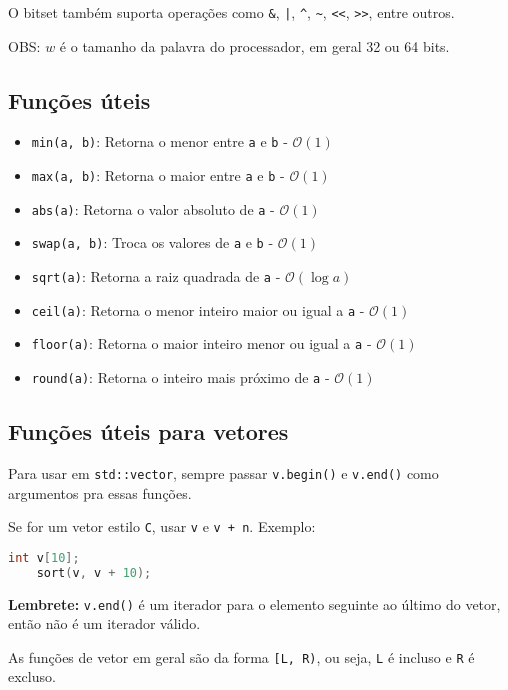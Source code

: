 \documentclass[10pt, a4paper, oneside]{book}
\begin{document}
O bitset também suporta operações como \verb|&|, \verb/|/, \verb|^|, \verb|~|, \verb|<<|, \verb|>>|, entre outros.

OBS: $w$ é o tamanho da palavra do processador, em geral 32 ou 64 bits.

\subsection{Funções úteis}

\begin{itemize}
    \item \texttt{min(a, b)}: Retorna o menor entre \texttt{a} e \texttt{b} - $\mathcal{O}(1)$
    \item \texttt{max(a, b)}: Retorna o maior entre \texttt{a} e \texttt{b} - $\mathcal{O}(1)$
    \item \texttt{abs(a)}: Retorna o valor absoluto de \texttt{a} - $\mathcal{O}(1)$
    \item \texttt{swap(a, b)}: Troca os valores de \texttt{a} e \texttt{b} - $\mathcal{O}(1)$
    \item \texttt{sqrt(a)}: Retorna a raiz quadrada de \texttt{a} - $\mathcal{O}(\log a)$
    \item \texttt{ceil(a)}: Retorna o menor inteiro maior ou igual a \texttt{a} - $\mathcal{O}(1)$
    \item \texttt{floor(a)}: Retorna o maior inteiro menor ou igual a \texttt{a} - $\mathcal{O}(1)$
    \item \texttt{round(a)}: Retorna o inteiro mais próximo de \texttt{a} - $\mathcal{O}(1)$
\end{itemize}

\subsection{Funções úteis para vetores}

Para usar em \texttt{std::vector}, sempre passar \texttt{v.begin()} e \texttt{v.end()} como argumentos pra essas funções.

Se for um vetor estilo \texttt{C}, usar \texttt{v} e \texttt{v + n}. 
Exemplo:
\begin{lstlisting}[language=C++]
    int v[10];
    sort(v, v + 10);
\end{lstlisting}

\textbf{Lembrete:} \texttt{v.end()} é um iterador para o elemento seguinte ao último do vetor, então não é um iterador válido.

As funções de vetor em geral são da forma \texttt{[L, R)}, ou seja, \texttt{L} é incluso e \texttt{R} é excluso.
\end{document}
